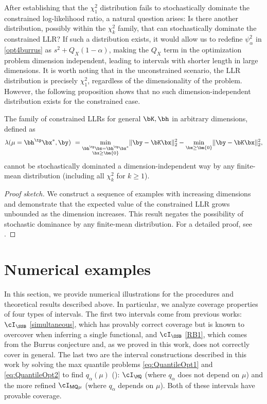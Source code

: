 \documentclass[11pt]{article}
\numberwithin{equation}{section}
\numberwithin{figure}{section}
\begin{document}
After establishing that the $\chi^2_1$ distribution fails to stochastically dominate the constrained log-likelihood ratio, a natural question arises: Is there another distribution, possibly within the $\chi^2_k$ family, that can stochastically dominate the constrained LLR? 
If such a distribution exists, it would allow us to redefine $\psi^2_\alpha$ in \eqref{opt4burrus} as $s^2 + Q_X(1-\alpha)$, making the $Q_X$ term in the optimization problem dimension independent, leading to intervals with shorter length in large dimensions.
It is worth noting that in the unconstrained scenario, the LLR distribution is precisely $\chi^2_1$, regardless of the dimensionality of the problem. However, the following proposition shows that no such dimension-independent distribution exists for the constrained case.
\begin{proposition}
\label{lemma:dimbounding}
The family of constrained LLRs for general $\bK, \bh$ in arbitrary dimensions, defined as
\begin{equation*}
\lambda(\mu = \bh^\tp\bx^*, \by) ~= \min_{\substack{\bh^\tp \bx = \bh^\tp\bx^*  \\ \bx \geq \bm{0}}} \lVert \by - \bK \bx \rVert_2^2 - \min_{\bx \geq \bm{0}} \lVert \by - \bK \bx \rVert_2^2,
\end{equation*}
cannot be stochastically dominated a dimension-independent way by any finite-mean distribution (including all $\chi^2_k$ for $k \ge 1$).
\end{proposition}
\begin{proof}[Proof sketch]
We construct a sequence of examples with increasing dimensions and demonstrate that the expected value of the constrained LLR grows unbounded as the dimension increases. 
This result negates the possibility of stochastic dominance by any finite-mean distribution. 
For a detailed proof, see .
\end{proof}

\section{Numerical examples}
\label{sec:numerical-examples}

In this section, we provide numerical illustrations for the procedures and theoretical results described above. 
In particular, we analyze coverage properties of four types of intervals. The first two intervals come from previous works: $\cI_{\SSB}$ \eqref{simultaneous}, which has provably correct coverage but is known to overcover when inferring a single functional, and $\cI_{\OSB}$ \eqref{RB1}, which comes from the Burrus conjecture and, as we proved in this work, does not correctly cover in general. 
The last two are the interval constructions described in this work by solving the max quantile problems \eqref{eq:QuantileOpt1} and \eqref{eq:QuantileOpt2} to find $q_\alpha(\mu)$ (): $\cI_{\MQ}$ (where $q_\alpha$ does not depend on $\mu$) and the more refined $\cI_{\mathsf{MQ\mu}}$ (where $q_\alpha$ depends on $\mu$). Both of these intervals have provable coverage.
\end{document}
